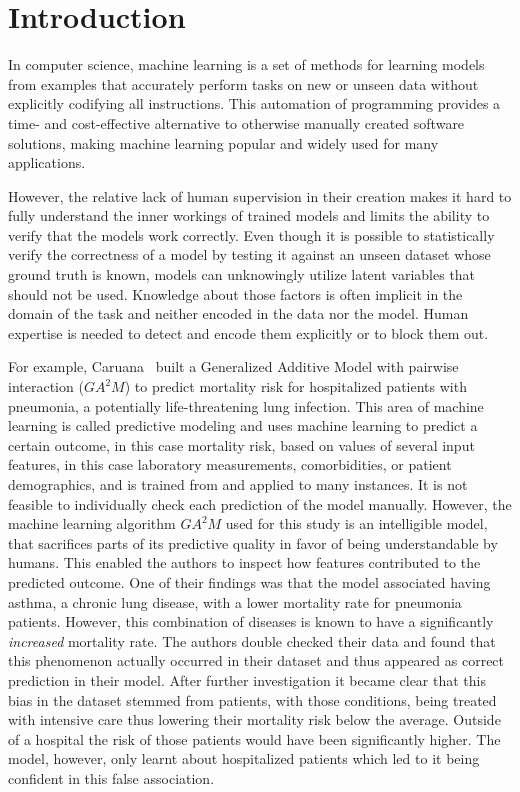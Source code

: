 \chapter{Introduction}
\vspace*{-2em}
In computer science, machine learning is a set of methods for learning models from examples that accurately perform tasks on new or unseen data without explicitly codifying all instructions. This automation of programming provides a time- and cost-effective alternative to otherwise manually created software solutions, making machine learning popular and widely used for many applications.

However, the relative lack of human supervision in their creation makes it hard to fully understand the inner workings of trained models and limits the ability to verify that the models work correctly. Even though it is possible to statistically verify the correctness of a model by testing it against an unseen dataset whose ground truth is known, models can unknowingly utilize latent variables that should not be used. Knowledge about those factors is often implicit in the domain of the task and neither encoded in the data nor the model. Human expertise is needed to detect and encode them explicitly or to block them out.

For example, Caruana~\etal\cite{Caruana:2015:IMH:2783258.2788613} built a Generalized Additive Model with pairwise interaction ($GA^2M$) to predict mortality risk for hospitalized patients with pneumonia, a potentially life-threatening lung infection. This area of machine learning is called predictive modeling and uses machine learning to predict a certain outcome, in this case mortality risk, based on values of several input features, in this case laboratory measurements, comorbidities, or patient demographics, and is trained from and applied to many instances. It is not feasible to individually check each prediction of the model manually. However, the machine learning algorithm $GA^2M$ used for this study is an intelligible model, that sacrifices parts of its predictive quality in favor of being understandable by humans. This enabled the authors to inspect how features contributed to the predicted outcome. One of their findings was that the model associated having asthma, a chronic lung disease, with a lower mortality rate for pneumonia patients. However, this combination of diseases is known to have a significantly \emph{increased} mortality rate. The authors double checked their data and found that this phenomenon actually occurred in their dataset and thus appeared as correct prediction in their model. After further investigation it became clear that this bias in the dataset stemmed from patients, with those conditions, being treated with intensive care thus lowering their mortality risk below the average. Outside of a hospital the risk of those patients would have been significantly higher. The model, however, only learnt about hospitalized patients which led to it being confident in this false association.

